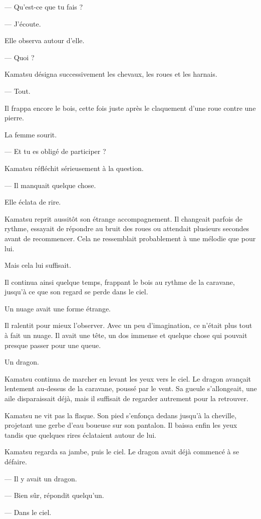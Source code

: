 — Qu'est-ce que tu fais ?

— J'écoute.

Elle observa autour d'elle.

— Quoi ?

Kamatsu désigna successivement les chevaux, les roues et les harnais.

— Tout.

Il frappa encore le bois, cette fois juste après le claquement d'une roue
contre une pierre.

La femme sourit.

— Et tu es obligé de participer ?

Kamatsu réfléchit sérieusement à la question.

— Il manquait quelque chose.

Elle éclata de rire.

Kamatsu reprit aussitôt son étrange accompagnement. Il changeait parfois de
rythme, essayait de répondre au bruit des roues ou attendait plusieurs secondes
avant de recommencer. Cela ne ressemblait probablement à une mélodie que pour
lui.

Mais cela lui suffisait.

Il continua ainsi quelque temps, frappant le bois au rythme de la caravane, jusqu'à ce que son regard se perde dans le ciel.

Un nuage avait une forme étrange.

Il ralentit pour mieux l'observer. Avec un peu d'imagination, ce n'était plus
tout à fait un nuage. Il avait une tête, un dos immense et quelque chose qui
pouvait presque passer pour une queue.

Un dragon.

Kamatsu continua de marcher en levant les yeux vers le ciel. Le dragon avançait
lentement au-dessus de la caravane, poussé par le vent. Sa gueule s'allongeait,
une aile disparaissait déjà, mais il suffisait de regarder autrement pour la
retrouver.

Kamatsu ne vit pas la flaque. Son pied s'enfonça dedans jusqu'à la cheville, projetant une gerbe d'eau boueuse sur son pantalon. Il baissa enfin les yeux tandis que quelques rires éclataient autour de lui.

Kamatsu regarda sa jambe, puis le ciel. Le dragon avait déjà commencé à se
défaire.

— Il y avait un dragon.

— Bien sûr, répondit quelqu'un.

— Dans le ciel.

